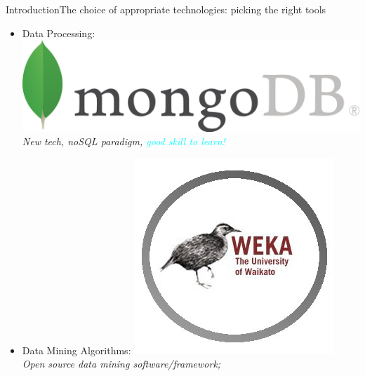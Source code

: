 \begin{frame}{Introduction}{The choice of appropriate technologies: picking the right tools}

	\begin{block}{}
	    \begin{itemize}
		    \item<1-> \alert{Data Processing}: \hspace{0.2cm} \includegraphics[scale=0.18, trim=0 0.8cm 0 0]{../thesis/img/mongodb.png} \\\vspace{0.2cm} \emph{New tech, noSQL paradigm, \textcolor{cyan}{good skill to learn!}}
		    \item<2-> \alert{Data Mining Algorithms}: \hspace{0.2cm} \includegraphics[scale=0.16, trim=0 3.2cm 0 0]{../thesis/img/weka_noback.png}  \\\vspace{0.35cm} \emph{Open source data mining software/framework;} \\\vspace{0.2cm}

\end{itemize}
\end{block}
\end{frame}

